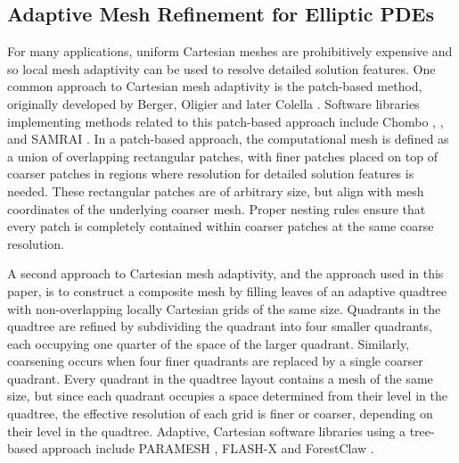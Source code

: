 
\subsection{Adaptive Mesh Refinement for Elliptic PDEs}

For many applications, uniform Cartesian meshes are prohibitively expensive and so local mesh adaptivity can be used to resolve detailed solution features.  One common approach to Cartesian mesh adaptivity is the patch-based method, originally developed by Berger, Oligier and later Colella . Software libraries implementing methods related to this patch-based approach include Chombo \cite{colella2009chombo}, \amrex \cite{zhang2019amrex}, and SAMRAI \cite{hornung2006managing}. In a patch-based approach, the computational mesh is defined as a union of overlapping rectangular patches, with finer patches placed on top of coarser patches in regions where resolution for  detailed solution features is needed.  These rectangular patches are of arbitrary size, but align with mesh coordinates of the underlying coarser mesh. Proper nesting rules ensure that every patch is completely contained within coarser patches at the same coarse resolution. 

A second approach to Cartesian mesh adaptivity, and the approach used in this paper, is to construct a composite mesh by filling leaves of an adaptive quadtree with non-overlapping locally Cartesian grids of the same size. Quadrants in the quadtree are refined by subdividing the quadrant into four smaller quadrants, each occupying one quarter of the space of the larger quadrant. Similarly, coarsening occurs when four finer quadrants are replaced by a single coarser quadrant.  Every quadrant in the quadtree layout contains a mesh of the same size, but since each quadrant occupies a space determined from their level in the quadtree, the effective resolution of each grid is finer or coarser, depending on their level in the quadtree.  Adaptive, Cartesian software libraries using a tree-based approach include PARAMESH \cite{globisch1995parmesh}, FLASH-X \cite{dubey2022flash} and ForestClaw \cite{calhoun2017forestclaw}.


